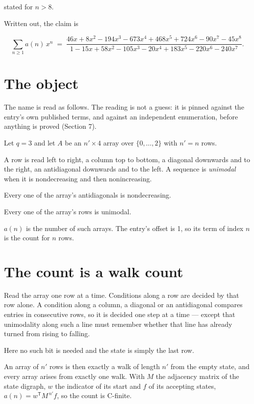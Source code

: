 \documentclass[11pt]{article}
\theoremstyle{definition}
\begin{document}
stated for $n > 8$.

Written out, the claim is

\[\sum_{n \ge 1} a(n)\,x^n \;=\; \frac{46x + 8x^{2} - 194x^{3} - 673x^{4} + 468x^{5} + 724x^{6} - 90x^{7} - 45x^{8}}{1 - 15x + 58x^{2} - 105x^{3} - 20x^{4} + 183x^{5} - 220x^{6} - 240x^{7}}.\]

\section{The object}

The name is read as follows. The reading is not a guess: it is pinned against the entry's own published terms, and against an independent enumeration, before anything is proved (Section 7).

Let $q = 3$ and let $A$ be an $n' \times 4$ array over $\{0,\dots,2\}$ with $n' = n$ rows.

A row is read left to right, a column top to bottom, a diagonal downwards and to the right, an antidiagonal downwards and to the left. A sequence is {\itshape unimodal} when it is nondecreasing and then nonincreasing.

Every one of the array's antidiagonals is nondecreasing.

Every one of the array's rows is unimodal.

$a(n)$ is the number of such arrays. The entry's offset is 1, so its term of index $n$ is the count for $n$ rows.

\section{The count is a walk count}

Read the array one row at a time. Conditions along a row are decided by that row alone. A condition along a column, a diagonal or an antidiagonal compares entries in consecutive rows, so it is decided one step at a time --- except that unimodality along such a line must remember whether that line has already turned from rising to falling.

Here no such bit is needed and the state is simply the last row.

An array of $n'$ rows is then exactly a walk of length $n'$ from the empty state, and every array arises from exactly one walk. With $M$ the adjacency matrix of the state digraph, $w$ the indicator of its start and $f$ of its accepting states, $a(n) = w^{\mathsf T}M^{\,n'}f$, so the count is C-finite.
\end{document}

